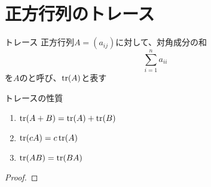 \documentclass[../../../topic_linear-algebra]{subfiles}
\begin{document}
\sectionline
\section{正方行列のトレース}

\begin{definition}{トレース}
  正方行列$A=(a_{ij})$に対して、対角成分の和
  \begin{equation*}
    \sum_{i=1}^n a_{ii}
  \end{equation*}
  を$A$のと呼び、$\tr(A)$と表す
\end{definition}

\begin{theorem}{トレースの性質}
  \begin{enumerate}[label=\romanlabel]
    \item $\tr(A+B) = \tr(A) + \tr(B)$
    \item $\tr(cA) = c\tr(A)$
    \item $\tr(AB) = \tr(BA)$
  \end{enumerate}
\end{theorem}

\begin{proof}
\end{proof}
\end{document}
